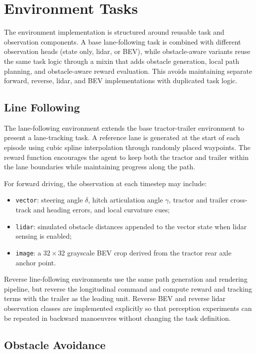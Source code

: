 \section{Environment Tasks}

The environment implementation is structured around reusable task and observation components. A base lane-following task is combined with different observation heads (state only, lidar, or BEV), while obstacle-aware variants reuse the same task logic through a mixin that adds obstacle generation, local path planning, and obstacle-aware reward evaluation. This avoids maintaining separate forward, reverse, lidar, and BEV implementations with duplicated task logic.

\subsection{Line Following}

The lane-following environment extends the base tractor-trailer environment to present a lane-tracking task. A reference lane is generated at the start of each episode using cubic spline interpolation through randomly placed waypoints. The reward function encourages the agent to keep both the tractor and trailer within the lane boundaries while maintaining progress along the path.

For forward driving, the observation at each timestep may include:
\begin{itemize}
    \item \texttt{vector}: steering angle $\delta$, hitch articulation angle $\gamma$, tractor and trailer cross-track and heading errors, and local curvature cues;
    \item \texttt{lidar}: simulated obstacle distances appended to the vector state when lidar sensing is enabled;
    \item \texttt{image}: a $32 \times 32$ grayscale BEV crop derived from the tractor rear axle anchor point.
\end{itemize}

Reverse line-following environments use the same path generation and rendering pipeline, but reverse the longitudinal command and compute reward and tracking terms with the trailer as the leading unit. Reverse BEV and reverse lidar observation classes are implemented explicitly so that perception experiments can be repeated in backward manoeuvres without changing the task definition.

\subsection{Obstacle Avoidance}

